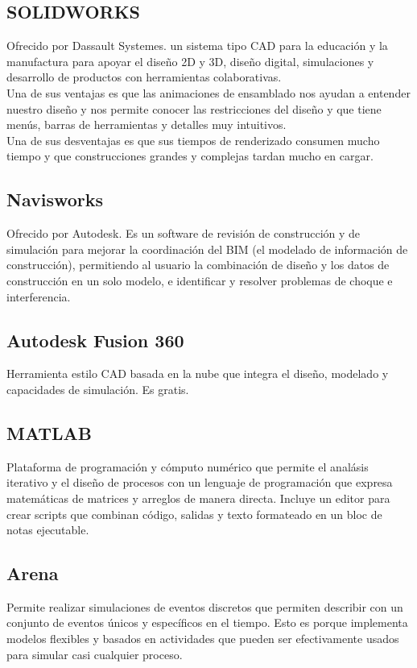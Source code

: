 \documentclass[letterpaper, 12pt]{article}
\begin{document}
    \newpage
    \begin{justify}
        \setcounter{page}{1}
        \thispagestyle{empty}
        \subsection*{SOLIDWORKS}
        \justify
        Ofrecido por Dassault Systemes. un sistema tipo CAD para la educación y la manufactura para apoyar el diseño 2D y 3D,
        diseño digital, simulaciones y desarrollo de productos con herramientas colaborativas.
        \\\newline
        Una de sus ventajas es que las animaciones de ensamblado nos ayudan a entender nuestro diseño y nos permite conocer las restricciones del diseño y que
        tiene menús, barras de herramientas y detalles muy intuitivos.
        \\\newline
        Una de sus desventajas es que sus tiempos de renderizado consumen mucho tiempo y que construcciones grandes y complejas tardan mucho en cargar.
        \subsection*{Navisworks}
        \justify
        Ofrecido por Autodesk. Es un software de revisión de construcción y de simulación para mejorar la coordinación del BIM (el modelado de información de construcción),
        permitiendo al usuario la combinación de diseño y los datos de construcción en un solo modelo, e identificar y resolver problemas de choque e interferencia.
        \subsection*{Autodesk Fusion 360}
        \justify
        Herramienta estilo CAD basada en la nube que integra el diseño, modelado y capacidades de simulación. Es gratis.
        \subsection*{MATLAB}
        \justify
        Plataforma de programación y cómputo numérico que permite el analásis iterativo y el diseño de procesos con un lenguaje de programación que expresa matemáticas de matrices y arreglos
        de manera directa. Incluye un editor para crear scripts que combinan código, salidas y texto formateado en un bloc de notas ejecutable.
        \subsection*{Arena}
        \justify
        Permite realizar simulaciones de eventos discretos que permiten describir con un conjunto de eventos únicos y específicos en el tiempo. Esto es porque implementa modelos flexibles y basados en actividades
        que pueden ser efectivamente usados para simular casi cualquier proceso.
    \end{justify}
\end{document}
